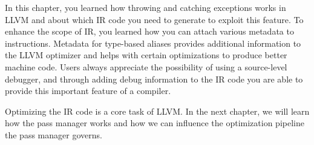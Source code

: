 In this chapter, you learned how throwing and catching exceptions works in LLVM and about which IR code you need to generate to exploit this feature. To enhance the scope of IR, you learned how you can attach various metadata to instructions. Metadata for type-based aliases provides additional information to the LLVM optimizer and helps with certain optimizations to produce better machine code. Users always appreciate the possibility of using a source-level debugger, and through adding debug information to the IR code you are able to provide this important feature of a compiler.\par

Optimizing the IR code is a core task of LLVM. In the next chapter, we will learn how the pass manager works and how we can influence the optimization pipeline the pass manager governs.\par